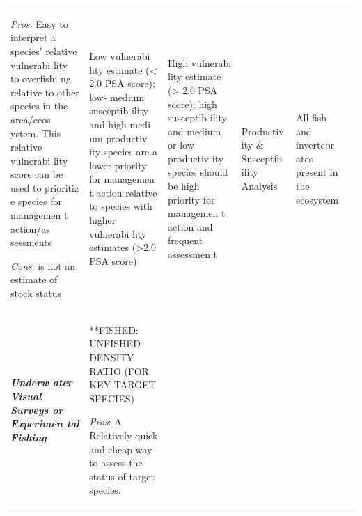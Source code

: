 \documentclass[]{book}
\begin{document}
\begin{longtable}[]{@{}llllll@{}}
\begin{minipage}[t]{0.16\columnwidth}
\emph{Pros}: Easy to interpret a species' relative vulnerabi lity to
overfishi ng relative to other species in the area/ecos ystem. This
relative vulnerabi lity score can be used to prioritiz e species for
managemen t action/as sessments

\emph{Cons}: is not an estimate of stock status\strut
\end{minipage} & \begin{minipage}[t]{0.16\columnwidth}\raggedright\strut
Low vulnerabi lity estimate (\emph{\textless{}} 2.0 PSA score); low-
medium susceptib ility and high-medi um productiv ity species are a
lower priority for managemen t action relative to species with higher
vulnerabi lity estimates (\textgreater{}2.0 PSA score)\strut
\end{minipage} & \begin{minipage}[t]{0.16\columnwidth}\raggedright\strut
High vulnerabi lity estimate (\textgreater{} 2.0 PSA score); high
susceptib ility and medium or low productiv ity species should be high
priority for managemen t action and frequent assessmen t\strut
\end{minipage} & \begin{minipage}[t]{0.16\columnwidth}\raggedright\strut
Productiv ity \& Susceptib ility Analysis\strut
\end{minipage} & \begin{minipage}[t]{0.16\columnwidth}\raggedright\strut
All fish and invertebr ates present in the ecosystem\strut
\end{minipage}\tabularnewline
\begin{minipage}[t]{0.16\columnwidth}\raggedright\strut
\emph{\textbf{Underw ater Visual Surveys or Experimen tal Fishing}
}\strut
\end{minipage} & \begin{minipage}[t]{0.16\columnwidth}\raggedright\strut
**FISHED: UNFISHED DENSITY RATIO (FOR KEY TARGET SPECIES)\emph{ }

\emph{Pros}: A Relatively quick and cheap way to assess the status of
target species.


\end{minipage}
\end{longtable}
\end{document}
